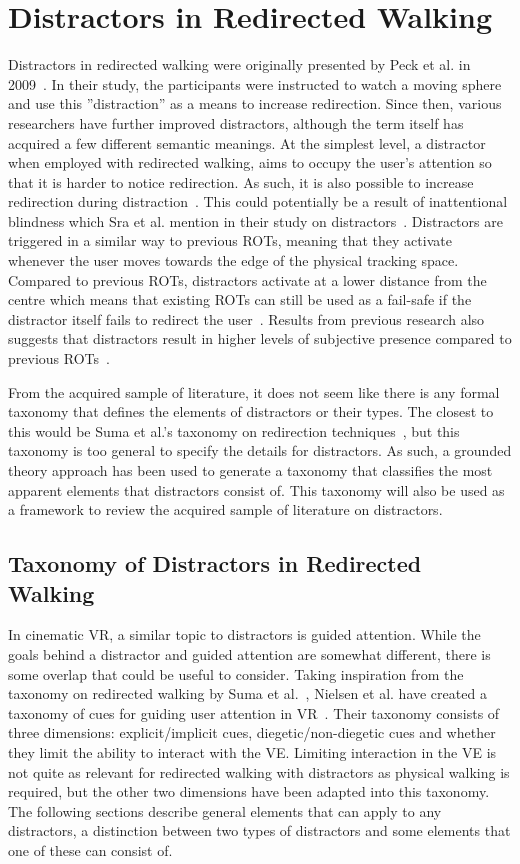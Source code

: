 \section{Distractors in Redirected Walking}
Distractors in redirected walking were originally presented by Peck et al. in 2009~\cite{peck2009evaluation}. In their study, the participants were instructed to watch a moving sphere and use this ''distraction'' as a means to increase redirection. Since then, various researchers have further improved distractors, although the term itself has acquired a few different semantic meanings. At the simplest level, a distractor when employed with redirected walking, aims to occupy the user's attention so that it is harder to notice redirection. As such, it is also possible to increase redirection during distraction~\cite{5072212}. This could potentially be a result of inattentional blindness which Sra et al. mention in their study on distractors~\cite{sra2018vmotion}. Distractors are triggered in a similar way to previous ROTs, meaning that they activate whenever the user moves towards the edge of the physical tracking space. Compared to previous ROTs, distractors activate at a lower distance from the centre which means that existing ROTs can still be used as a fail-safe if the distractor itself fails to redirect the user~\cite{suma2012taxonomy}. Results from previous research also suggests that distractors result in higher levels of subjective presence compared to previous ROTs~\cite{peck2011evaluation}. 

From the acquired sample of literature, it does not seem like there is any formal taxonomy that defines the elements of distractors or their types. The closest to this would be Suma et al.'s taxonomy on redirection techniques~\cite{suma2012taxonomy}, but this taxonomy is too general to specify the details for distractors. As such, a grounded theory approach has been used to generate a taxonomy that classifies the most apparent elements that distractors consist of. This taxonomy will also be used as a framework to review the acquired sample of literature on distractors.

\subsection{Taxonomy of Distractors in Redirected Walking}
In cinematic VR, a similar topic to distractors is guided attention. While the goals behind a distractor and guided attention are somewhat different, there is some overlap that could be useful to consider. Taking inspiration from the taxonomy on redirected walking by Suma et al.~\cite{suma2012taxonomy}, Nielsen et al. have created a taxonomy of cues for guiding user attention in VR~\cite{nielsen2016missing}. Their taxonomy consists of three dimensions: explicit/implicit cues, diegetic/non-diegetic cues and whether they limit the ability to interact with the VE. Limiting interaction in the VE is not quite as relevant for redirected walking with distractors as physical walking is required, but the other two dimensions have been adapted into this taxonomy. The following sections describe general elements that can apply to any distractors, a distinction between two types of distractors and some elements that one of these can consist of. 

